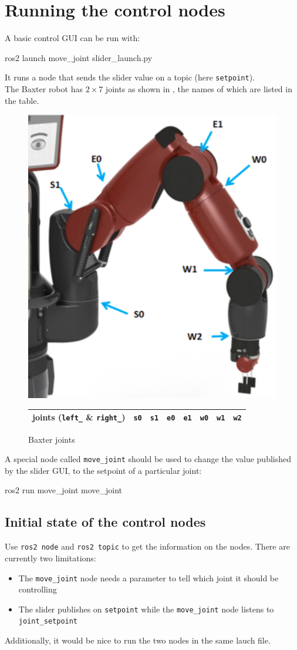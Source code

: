 \documentclass{ecnreport}
\begin{document}
\section{Running the control nodes}

A basic control GUI can be run with:

\begin{bashcodelarge}
 ros2 launch move_joint slider_launch.py
\end{bashcodelarge}
It runs a node that sends the slider value on a topic (here \texttt{setpoint}).\\

The Baxter robot has $2\times 7$ joints as shown in , the names of which are listed in the table.
\begin{figure}[h]\centering
 \includegraphics[width=.3\linewidth]{baxter} \\
  \begin{tabular}{|c|c|c|c|c|c|c|c|}
  \hline
  joints (\texttt{left\_} \& \texttt{right\_})& \texttt{s0} & \texttt{s1}& \texttt{e0} & \texttt{e1} & \texttt{w0} & \texttt{w1} & \texttt{w2} \\\hline
 \end{tabular}
 \caption{Baxter joints}
 \label{baxter}
\end{figure}

A special node called \texttt{move\_joint} should be used to change the value published by the slider GUI, to the setpoint of a particular joint:
\begin{bashcodelarge}
 ros2 run move_joint move_joint
\end{bashcodelarge}

\subsection{Initial state of the control nodes}

Use \texttt{ros2 node} and \texttt{ros2 topic} to get the information on the nodes. There are currently two limitations:
\begin{itemize}
 \item The \texttt{move\_joint} node needs a parameter to tell which joint it should be controlling
 \item The slider publishes on \texttt{setpoint} while the  \texttt{move\_joint} node listens to \texttt{joint\_setpoint}
\end{itemize}
Additionally, it would be nice to run the two nodes in the same lauch file.
\end{document}
